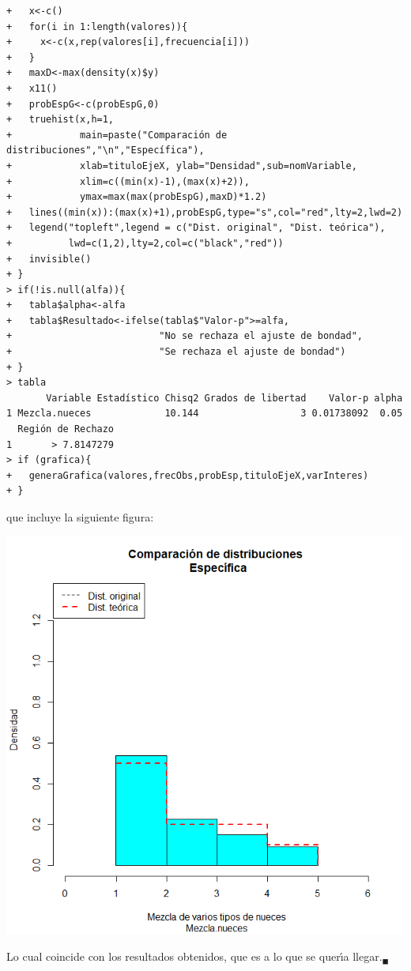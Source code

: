 \begin{solucion}
\begin{verbatim}
+   x<-c()
+   for(i in 1:length(valores)){
+     x<-c(x,rep(valores[i],frecuencia[i]))
+   }
+   maxD<-max(density(x)$y)
+   x11()
+   probEspG<-c(probEspG,0)
+   truehist(x,h=1,
+            main=paste("Comparación de distribuciones","\n","Específica"),
+            xlab=tituloEjeX, ylab="Densidad",sub=nomVariable,
+            xlim=c((min(x)-1),(max(x)+2)),
+            ymax=max(max(probEspG),maxD)*1.2)
+   lines((min(x)):(max(x)+1),probEspG,type="s",col="red",lty=2,lwd=2)
+   legend("topleft",legend = c("Dist. original", "Dist. teórica"),
+          lwd=c(1,2),lty=2,col=c("black","red"))
+   invisible()
+ }
> if(!is.null(alfa)){
+   tabla$alpha<-alfa
+   tabla$Resultado<-ifelse(tabla$"Valor-p">=alfa,
+                          "No se rechaza el ajuste de bondad",
+                          "Se rechaza el ajuste de bondad")
+ }
> tabla
       Variable Estadístico Chisq2 Grados de libertad    Valor-p alpha
1 Mezcla.nueces             10.144                  3 0.01738092  0.05
  Región de Rechazo
1       > 7.8147279
> if (grafica){
+   generaGrafica(valores,frecObs,probEsp,tituloEjeX,varInteres)
+ }
 \end{verbatim}
 \vspace{-0.5cm}
 que incluye la siguiente figura:
 \begin{center}
  \includegraphics[scale=0.35]{Problema_81.png}
 \end{center}
 Lo cual coincide con los resultados obtenidos,
 que es a lo que se quer\'{\i}a llegar.${}_{\blacksquare}$
\end{solucion}
